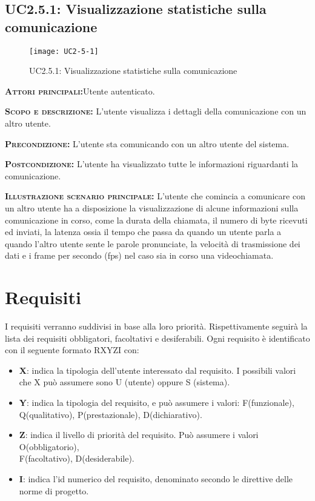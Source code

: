 \subsection{UC2.5.1: Visualizzazione statistiche sulla comunicazione}
\begin{figure}[h!]
\centering
\texttt{[image: UC2-5-1]}
\caption{UC2.5.1: Visualizzazione statistiche sulla comunicazione}\label{UC2.5.1}
\end{figure}
\begin{description}
\item{\scshape\bfseries Attori principali:}Utente autenticato.
\item{\scshape\bfseries Scopo e descrizione:} L'utente visualizza i dettagli della comunicazione con un altro utente.
\item{\scshape\bfseries Precondizione:} L'utente sta comunicando con un altro utente del sistema.
\item{\scshape\bfseries Postcondizione:} L'utente ha visualizzato tutte le informazioni riguardanti la comunicazione.
\item{\scshape\bfseries Illustrazione scenario principale:} L'utente che comincia a comunicare con un altro utente ha a disposizione la visualizzazione di alcune informazioni sulla comunicazione in corso, come la durata della chiamata, il numero di byte ricevuti ed inviati, la latenza ossia il tempo che passa da quando un utente parla a quando l'altro utente sente le parole pronunciate, la velocità di trasmissione dei dati e i frame per secondo (fps) nel caso sia in corso una videochiamata.
\end{description}

\newpage\section{Requisiti}

I requisiti verranno suddivisi in base alla loro priorità. Rispettivamente seguirà la lista dei requisiti obbligatori, facoltativi e desiferabili. Ogni requisito è identificato con il seguente formato RXYZI con:


		\begin{itemize}

			\item \textbf{X}: indica la tipologia dell'utente interessato dal requisito. I possibili valori che X può assumere sono U (utente) oppure S (sistema).

			\item \textbf{Y}: indica la tipologia del requisito, e può assumere i valori: F(funzionale), Q(qualitativo), P(prestazionale), D(dichiarativo).

			\item \textbf{Z}: indica il livello di priorità del requisito. Può assumere i valori O(obbligatorio), \\F(facoltativo), D(desiderabile).

			\item \textbf{I}: indica l'id numerico del requisito, denominato secondo le direttive delle norme di progetto.

		\end{itemize}


